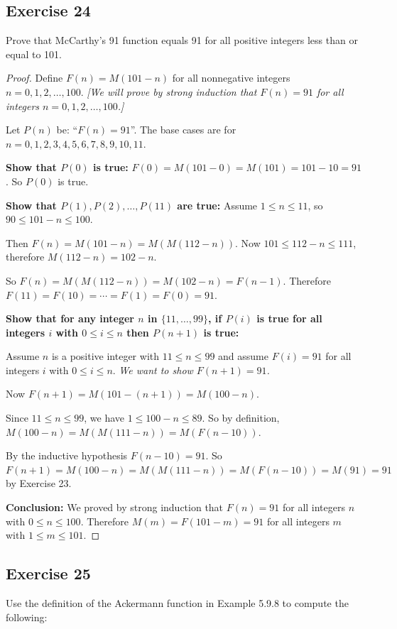 \documentclass[14pt]{extarticle}
\begin{document}
\subsection{Exercise 24}
Prove that McCarthy’s 91 function equals 91 for all positive integers less than or equal to 101.

\begin{proof}
Define \(F(n) = M(101 - n)\) for all nonnegative integers \(n = 0, 1, 2, \ldots, 100\).
{\it [We will prove by strong induction that \(F(n) = 91\) for all integers \(n = 0, 1, 2, \ldots, 100\).]}

Let $P(n)$ be: ``\(F(n) = 91\)''. The base cases are for \(n = 0, 1, 2, 3, 4, 5, 6, 7, 8, 9, 10, 11\).

{\bf Show that $P(0)$ is true:} \(F(0) = M(101 - 0) = M(101) = 101 - 10 = 91\). So $P(0)$ is true.

{\bf Show that \(P(1), P(2), \ldots, P(11)\) are true:} Assume \(1 \leq n \leq 11\), so \(90 \leq 101-n \leq 100\).

Then \(F(n) = M(101 - n) = M(M(112 - n))\). Now \(101 \leq 112-n \leq 111\), therefore \(M(112 - n) = 102 - n\).

So \(F(n) = M(M(112 - n)) = M(102 - n) = F(n-1)\).
Therefore \(F(11) = F(10) = \cdots = F(1) = F(0) = 91\).

{\bf Show that for any integer $n$ in \(\{11, \ldots, 99\}\), if $P(i)$ is true for all integers $i$ with 
\(0 \leq i \leq n\) then $P(n+1)$ is true:} 

Assume $n$ is a positive integer with \(11 \leq n \leq 99\) and assume \(F(i) = 91\) for all integers $i$ with 
\(0 \leq i \leq n\). {\it We want to show \(F(n+1) = 91\).}

Now \(F(n+1) = M(101 - (n+1)) = M(100 - n)\). 

Since \(11 \leq n \leq 99\), we have \(1 \leq 100-n \leq 89\). So by definition, \(M(100 - n) = M(M(111 - n)) = M(F(n-10))\). 

By the inductive hypothesis \(F(n-10) = 91\). So \(F(n+1) = M(100 - n) = M(M(111 - n)) = M(F(n-10)) = M(91) = 91\) by Exercise 23.

{\bf Conclusion:} We proved by strong induction that \(F(n) = 91\) for all integers $n$ with \(0 \leq n \leq 100\). 
Therefore \(M(m) = F(101 - m) = 91\) for all integers $m$ with \(1 \leq m \leq 101\). 
\end{proof}

\subsection{Exercise 25}
Use the definition of the Ackermann function in Example 5.9.8 to compute the following:
\end{document}
